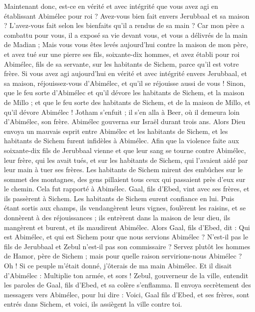 \begin{multicols}{2}
Maintenant donc, est-ce en vérité et avec intégrité que vous avez agi en établissant Abimélec pour roi ? Avez-vous bien fait envers Jerubbaal et sa maison ? L'avez-vous fait selon les bienfaits qu'il a rendus de sa main ?
Car mon père a combattu pour vous, il a exposé sa vie devant vous, et vous a délivrés de la main de Madian ;
Mais vous vous êtes levés aujourd'hui contre la maison de mon père, et avez tué sur une pierre ses fils, soixante-dix hommes, et avez établi pour roi Abimélec, fils de sa servante, sur les habitants de Sichem, parce qu'il est votre frère.
Si vous avez agi aujourd'hui en vérité et avec intégrité envers Jerubbaal, et sa maison, réjouissez-vous d'Abimélec, et qu'il se réjouisse aussi de vous !
Sinon, que le feu sorte d'Abimélec et qu'il dévore les habitants de Sichem, et la maison de Millo ; et que le feu sorte des habitants de Sichem, et de la maison de Millo, et qu'il dévore Abimélec !
Jotham s'enfuit ; il s'en alla à Beer, où il demeura loin d'Abimélec, son frère.
Abimélec gouverna sur Israël durant trois ans.
Alors Dieu envoya un mauvais esprit entre Abimélec et les habitants de Sichem, et les habitants de Sichem furent infidèles à Abimélec.
Afin que la violence faite aux soixante-dix fils de Jerubbaal vienne et que leur sang se tourne contre Abimélec, leur frère, qui les avait tués, et sur les habitants de Sichem, qui l'avaient aidé par leur main à tuer ses frères.
Les habitants de Sichem mirent des embûches sur le sommet des montagnes, des gens pillaient tous ceux qui passaient près d'eux sur le chemin. Cela fut rapporté à Abimélec.
Gaal, fils d'Ebed, vint avec ses frères, et ils passèrent à Sichem. Les habitants de Sichem eurent confiance en lui.
Puis étant sortis aux champs, ils vendangèrent leurs vignes, foulèrent les raisins, et se donnèrent à des réjouissances ; ils entrèrent dans la maison de leur dieu, ils mangèrent et burent, et ils maudirent Abimélec.
Alors Gaal, fils d'Ebed, dit : Qui est Abimélec, et qui est Sichem pour que nous servions Abimélec ? N'est-il pas le fils de Jerubbaal et Zebul n'est-il pas son commissaire ? Servez plutôt les hommes de Hamor, père de Sichem ; mais pour quelle raison servirions-nous Abimélec ?
Oh ! Si ce peuple m'était donné, j'ôterais de ma main Abimélec. Et il disait d'Abimélec : Multiplie ton armée, et sors !
Zebul, gouverneur de la ville, entendit les paroles de Gaal, fils d'Ebed, et sa colère s'enflamma.
Il envoya secrètement des messagers vers Abimélec, pour lui dire : Voici, Gaal fils d'Ebed, et ses frères, sont entrés dans Sichem, et voici, ils assiègent la ville contre toi.

\end{multicols}
